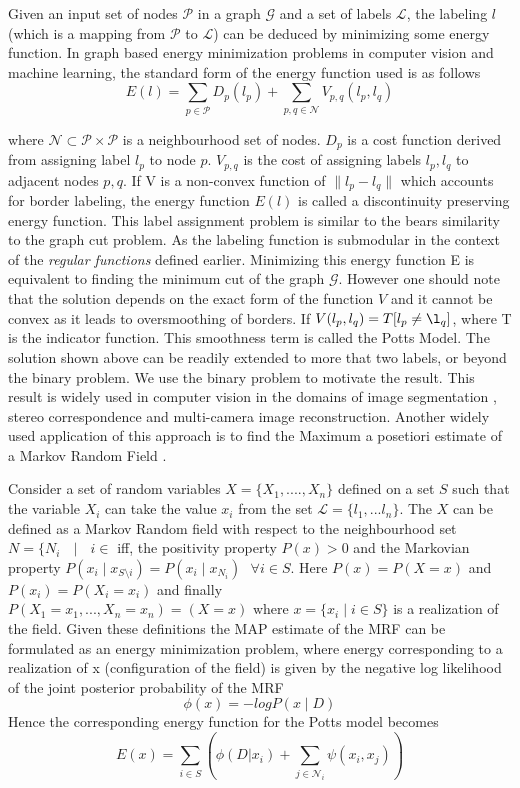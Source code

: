 Given an input set of nodes $\mathcal{P}$ in a graph $\mathcal{G}$ and a set of labels $\mathcal{L}$, the labeling $l$ (which is a mapping from $\mathcal{P}$ to $\mathcal{L}$) can be deduced by minimizing some energy function. In graph based energy minimization problems in computer vision and machine learning, the standard form of the energy function used is as follows
\[
E(l) = \underset{p\in\mathcal{P}}{\operatorname{\sum}} D_p(l_p) + \underset{p,q\in\mathcal{N}}{\operatorname{\sum}} V_{p,q}(l_p,l_q)
\]

where $\mathcal{N} \subset \mathcal{P}\times\mathcal{P}$ is a neighbourhood set of nodes. $D_p$ is a cost function derived from assigning label $l_p$ to node $p$. $V_{p,q}$ is the cost of assigning labels $l_p,l_q$ to adjacent nodes $p,q$. If V is a non-convex function of $\|l_p - l_q\|$ which accounts for border labeling, the energy function $E(l)$ is called a discontinuity preserving energy function. This label assignment problem is similar to the bears similarity to the graph cut problem. As the labeling function is submodular in the context of the {\it regular functions} defined earlier. Minimizing this energy function E is equivalent to finding the minimum cut of the graph $\mathcal{G}$. However one should note that the solution depends on the exact form of the function $V$ and it cannot be convex as it leads to oversmoothing of borders. If $V(l_p,l_q)=T[l_p\neq\l_q]$, where T is the indicator function. This smoothness term is called the Potts Model. The solution shown above can be readily extended to more that two labels, or beyond the binary problem. We use the binary problem to motivate the result. This result is widely used in computer vision in the domains of image segmentation , stereo correspondence and multi-camera image reconstruction. Another widely used application of this approach is to find the Maximum a posetiori estimate of a Markov Random Field \cite{MRFKohli}.

Consider a set of random variables $X = \{X_1,....,X_n\}$ defined on a set $S$ such that the variable $X_i$ can take the value $x_i$ from the set $\mathcal{L} = \{l_1,...l_n\}$. The $X$ can be defined as a Markov Random field with respect to the neighbourhood set $N = \{N_i \text{ } \mid \text{ } i\in$ iff, the positivity property $P(x) > 0$ and the Markovian property $P(x_i\mid x_{S\setminus {i}}) = P(x_i \mid x_{N_i}) \text{ } \forall i \in S$. Here $P(x) = P(X = x)$ and $P(x_i) = P(X_i = x_i)$ and finally $P(X_1 = x_1,...,X_n = x_n)  = (X = x) \text{ where } x = \{x_i \mid i\in S\}$ is a realization of the field. Given these definitions the MAP estimate of the MRF can be formulated as an energy minimization problem, where energy corresponding to a realization of x (configuration of the field) is given by the negative log likelihood of the joint posterior probability of the MRF
\[
\phi(x) = -logP(x\mid D)
\]
Hence the corresponding energy function for the Potts model becomes 
\[
E(x) =  \underset{i\in S}{\operatorname{\sum}} \left(\phi(D|x_i) + \underset{j\in \mathcal{N}_i}{\operatorname{\sum}}\psi(x_i,x_j) \right)
\]

